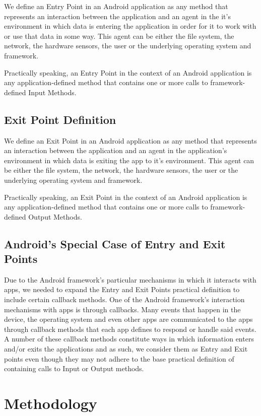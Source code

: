 \documentclass{sig-alternate}
\begin{document}
We define an Entry Point in an Android application as any method that represents an interaction between the application and an agent in the it's environment in which data is entering the application in order for it to work with or use that data in some way. This agent can be either the file system, the network, the hardware sensors, the user or the underlying operating system and framework.

Practically speaking, an Entry Point in the context of an Android application is any application-defined method that contains one or more calls to framework-defined Input Methods.

\subsection{Exit Point Definition}

We define an Exit Point in an Android application as any method that represents an interaction between the application and an agent in the application's environment in which data is exiting the app to it's environment. This agent can be either the file system, the network, the hardware sensors, the user or the underlying operating system and framework.

Practically speaking, an Exit Point in the context of an Android application is any application-defined method that contains one or more calls to framework-defined Output Methods.

\subsection{Android's Special Case of Entry and Exit Points}

Due to the Android framework's particular mechanisms in which it interacts with apps, we needed to expand the Entry and Exit Points practical definition to include certain callback methods. One of the Android framework’s interaction mechanisms with apps is through callbacks. Many events that happen in the device, the operating system and even other apps are communicated to the apps through callback methods that each app defines to respond or handle said events. A number of these callback methods constitute ways in which information enters and/or exits the applications and as such, we consider them as Entry and Exit points even though they may not adhere to the base practical definition of containing calls to Input or Output methods.

\section{Methodology}
\end{document}
